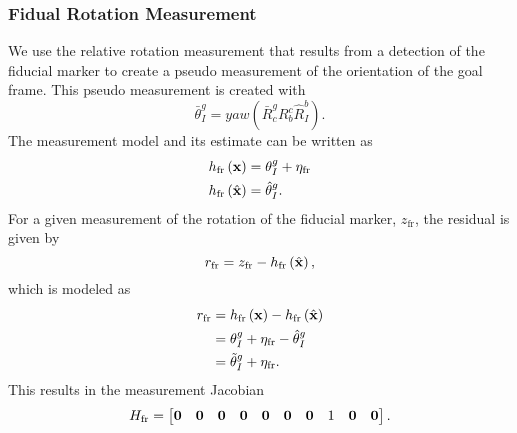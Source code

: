\subsubsection{Fidual Rotation Measurement}
We use the relative rotation measurement that results from a detection of the
fiducial marker
to create a pseudo measurement of the orientation of the goal frame. This pseudo
measurement is created with
\begin{equation}
  \bar{\theta}_I^g = yaw \left( \bar{R}_c^g R_b^c \hat{R}_I^b \right).
\end{equation}
The measurement model and its estimate can
be written as
\begin{align}
  h_{\text{fr}} \left( \boldsymbol{\mathrm{x}} \right) &= \theta_I^g + \eta_{\text{fr}} \\
  h_{\text{fr}} \left( \hat{\boldsymbol{\mathrm{x}}} \right) &= \hat{\theta}_I^g.
\end{align}
For a given measurement of the rotation of the fiducial marker, $z_{\text{fr}}$,
the residual is given by
\begin{equation}
  r_{\text{fr}} = z_{\text{fr}} - h_{\text{fr}} \left( \hat{\boldsymbol{\mathrm{x}}} \right),
\end{equation}
which is modeled as
\begin{align}
  r_{\text{fr}} &= h_{\text{fr}} \left( \boldsymbol{\mathrm{x}} \right) - h_{\text{fr}} \left( \hat{\boldsymbol{\mathrm{x}}} \right) \\
                &= \theta_I^g + \eta_{\text{fr}} - \hat{\theta}_I^g \\
                &= \tilde{\theta}_I^g + \eta_{\text{fr}}.
\end{align}
This results in the measurement Jacobian
\begin{equation}
  H_{\text{fr}} =
  \begin{bmatrix}
    \boldsymbol{\mathrm{0}} & \boldsymbol{\mathrm{0}} & \boldsymbol{\mathrm{0}} &
    \boldsymbol{\mathrm{0}} & \boldsymbol{\mathrm{0}} & \boldsymbol{\mathrm{0}} & \boldsymbol{\mathrm{0}} & 1 & \boldsymbol{\mathrm{0}} & \boldsymbol{\mathrm{0}}
  \end{bmatrix}.
\end{equation}


